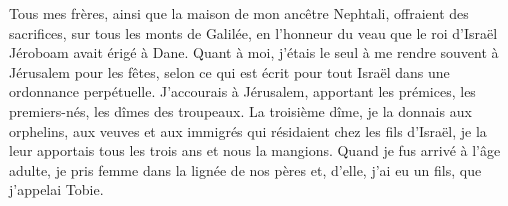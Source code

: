 Tous mes frères, ainsi que la maison de mon ancêtre Nephtali,
	offraient des sacrifices, sur tous les monts de Galilée,
	en l’honneur du veau que le roi d’Israël Jéroboam avait érigé à Dane.
Quant à moi, j’étais le seul à me rendre souvent à Jérusalem pour les fêtes,
	selon ce qui est écrit pour tout Israël dans une ordonnance perpétuelle.
J’accourais à Jérusalem, apportant les prémices,
		les premiers-nés, les dîmes des troupeaux.
La troisième dîme, je la donnais aux orphelins, aux veuves
	et aux immigrés qui résidaient chez les fils d’Israël,
	je la leur apportais tous les trois ans et nous la mangions.
Quand je fus arrivé à l’âge adulte, je pris femme dans la lignée de nos pères
	et, d’elle, j’ai eu un fils, que j’appelai Tobie.
